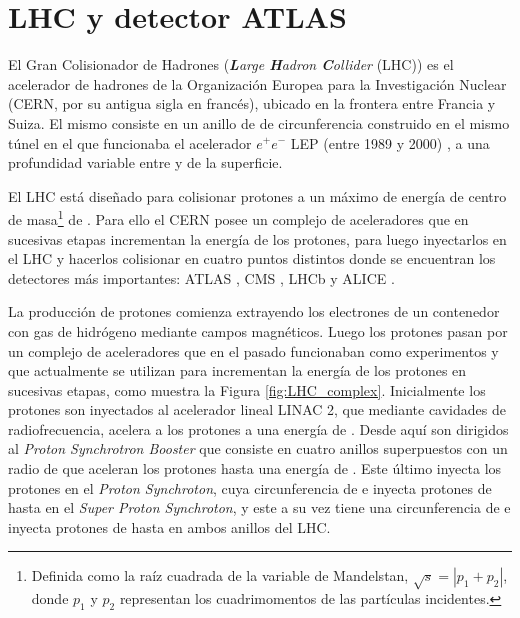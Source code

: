 \chapter{LHC y detector ATLAS}







El Gran Colisionador de Hadrones (\textit{\textbf{L}arge \textbf{H}adron \textbf{C}ollider} (LHC)) \cite{Evans:1129806} es el acelerador de hadrones de la Organización Europea para la Investigación Nuclear (CERN, por su antigua sigla en francés), ubicado en la frontera entre Francia y Suiza. El mismo consiste en un anillo de  de circunferencia construido en el mismo túnel en el que funcionaba el acelerador $e^{+}e^{-}$ LEP (entre 1989 y 2000) \cite{LEPbook}, a una profundidad variable entre  y  de la superficie.

El LHC está diseñado para colisionar protones a un máximo de energía de centro de masa\footnote{Definida como la raíz cuadrada de la variable de Mandelstan, $\sqrt{s}=|p_1+p_2|$, donde $p_1$ y $p_2$ representan los cuadrimomentos de las partículas incidentes.} de . Para ello el CERN posee un complejo de aceleradores que en sucesivas etapas incrementan la energía de los protones, para luego inyectarlos en el LHC y hacerlos colisionar en cuatro puntos distintos donde se encuentran los detectores más importantes: ATLAS \cite{PERF-2007-01}, CMS \cite{CMS}, LHCb \cite{LHCb} y ALICE \cite{ALICE}.

La producción de protones comienza extrayendo los electrones de un contenedor con gas de hidrógeno mediante campos magnéticos. Luego los protones pasan por un complejo de aceleradores que en el pasado funcionaban como experimentos y que actualmente se utilizan para incrementan la energía de los protones en sucesivas etapas, como muestra la Figura \ref{fig:LHC_complex}. Inicialmente los protones son inyectados al acelerador lineal LINAC 2, que mediante cavidades de radiofrecuencia, acelera a los protones a una energía de . Desde aquí son dirigidos al \textit{Proton Synchrotron Booster} que consiste en cuatro anillos superpuestos con un radio de  que aceleran los protones hasta una energía de . Este último inyecta los protones en el \textit{Proton Synchroton}, cuya circunferencia de  e inyecta protones de hasta  en el \textit{Super Proton Synchroton}, y este a su vez tiene una circunferencia de  e inyecta protones de hasta  en ambos anillos del LHC. 

